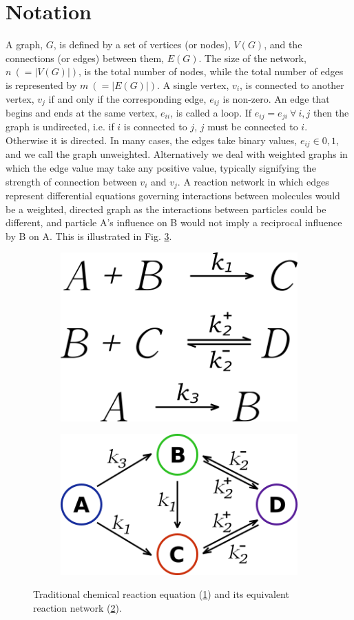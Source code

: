 \documentclass[11pt]{article}
\begin{document}
\section{Notation}
\label{sec:notation}
\indent A graph, $G$, is defined by a set of vertices (or nodes), $V(G)$, and the connections (or edges) between them, $E(G)$. The size of the network, $n \ ( = |V(G)|)$, is the total number of nodes, while the total number of edges is represented by $m \ (= |E(G)|)$. A single vertex, $v_{i}$, is connected to another vertex, $v_{j}$ if and only if the corresponding edge, $e_{ij}$ is non-zero. An edge that begins and ends at the same vertex, $e_{ii}$, is called a loop. If $e_{ij} = e_{ji} \ \forall \ i,j$ then the graph is undirected, i.e. if $i$ is connected to $j$, $j$ must be connected to $i$. Otherwise it is directed. In many cases, the edges take binary values, $e_{ij} \in {0,1}$, and we call the graph unweighted. Alternatively we deal with weighted graphs in which the edge value may take any positive value, typically signifying the strength of connection between $v_{i}$ and $v_{j}$. A reaction network in which edges represent differential equations governing interactions between molecules would be a weighted, directed graph as the interactions between particles could be different, and particle A's influence on B would not imply a reciprocal influence by B on A. This is illustrated in Fig. \ref{fig:rxn}. \vspace{1mm}
\begin{figure}[h!]
  \centering
  \begin{subfigure}{.5\textwidth}
    \centering
    \includegraphics[width=.4\linewidth]{rxnSchematic}
    \caption{}
    \label{fig:rxnSchematic}
  \end{subfigure}%
  \begin{subfigure}{.5\textwidth}
    \centering
    \includegraphics[width=.8\linewidth]{rxnNetwork}
    \caption{}
    \label{fig:rxnNetwork}
  \end{subfigure}%
  \caption{Traditional chemical reaction equation (\ref{fig:rxnSchematic}) and its equivalent reaction network (\ref{fig:rxnNetwork}).}
  \label{fig:rxn}
\end{figure}
\end{document}
